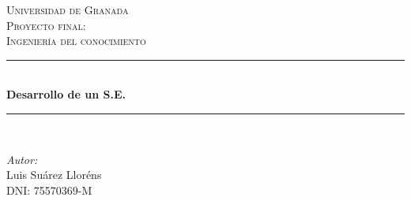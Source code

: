\begin{titlepage}

\newcommand{\HRule}{\rule{\linewidth}{0.5mm}} %

\center %
 

\textsc{\LARGE Universidad de Granada}\\[1.5cm] %
\textsc{\Large Proyecto final:}\\[0.5cm] %
\textsc{\large Ingeniería del conocimiento}\\[0.5cm] %


\HRule \\[0.4cm]
{ \huge \bfseries Desarrollo de un S.E.}\\[0.4cm] %
\HRule \\[1.5cm]
 

\begin{minipage}{0.4\textwidth}
\begin{flushleft} \large
\emph{Autor:}\\
Luis Suárez Lloréns\\ %
DNI: 75570369-M
\end{flushleft}
\end{minipage}
~
\begin{minipage}{0.4\textwidth}
\begin{flushright} \large
\end{flushright}
\end{minipage}\\[4cm]



\end{titlepage}
